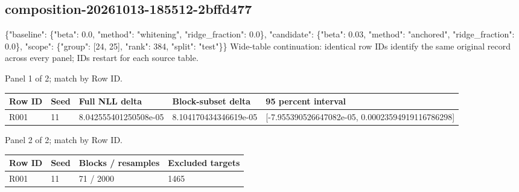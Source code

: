 \documentclass[10pt]{article}
\begin{document}
\subsection{composition-20261013-185512-2bffd477}
\{"baseline": \{"beta": 0.0, "method": "whitening", "ridge\_fraction": 0.0\}, "candidate": \{"beta": 0.03, "method": "anchored", "ridge\_fraction": 0.0\}, "scope": \{"group": [24, 25], "rank": 384, "split": "test"\}\}
Wide-table continuation: identical row IDs identify the same original record across every panel; IDs restart for each source table.
\par\noindent Panel 1 of 2; match by Row ID.
{\scriptsize\setlength{\tabcolsep}{2pt}
\begin{longtable}{p{}p{}p{}p{}p{}}
Row ID & Seed & Full NLL delta & Block-subset delta & 95 percent interval \\
\hline\endhead
R001 & 11 & 8.042555401250508e-05 & 8.104170434346619e-05 & [-7.955390526647082e-05, 0.00023594919116786298] \\
\end{longtable}}
\par\noindent Panel 2 of 2; match by Row ID.
{\scriptsize\setlength{\tabcolsep}{2pt}
\begin{longtable}{p{}p{}p{}p{}}
Row ID & Seed & Blocks / resamples & Excluded targets \\
\hline\endhead
R001 & 11 & 71 / 2000 & 1465 \\
\end{longtable}}
\end{document}

